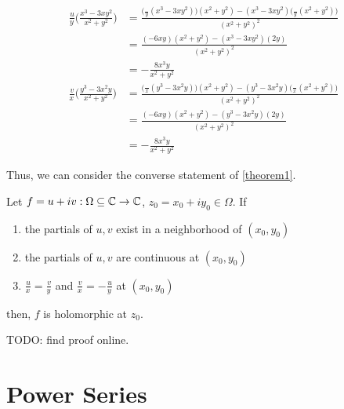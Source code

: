 \documentclass[11pt]{article}
\newcommand*{\pd}[3][]{\ensuremath{\frac{^{#1} #2}{ #3^{#1}}}}
\begin{document}
\begin{align*}
	\pd{u}{y}\bigg(\frac{x^3 - 3xy^2}{x^2+y^2}\bigg)
	&= \frac{\big(\pd{}{y}(x^3 - 3xy^2)\big)(x^2 + y^2) - (x^3 -
3xy^2)\big(\pd{}{y}(x^2+y^2)\big)}{(x^2 + y^2)^2}\\
&= \frac{(-6xy)(x^2 + y^2) - (x^3 - 3xy^2)(2y)}{(x^2 + y^2)^2}\\
&= -\frac{8x^3y}{x^2 + y^2}\\
\pd{v}{x}\bigg(\frac{y^3 - 3x^2y}{x^2+y^2} \bigg)
&= \frac{\big(\pd{}{x}(y^3 - 3x^2y)\big)(x^2 + y^2) - (y^3 -
3x^2y)\big(\pd{}{x}(x^2+y^2)\big)}{(x^2 + y^2)^2}\\
&= \frac{(-6xy)(x^2 + y^2) - (y^3 - 3x^2y)(2y)}{(x^2 + y^2)^2}\\
&= -\frac{8x^3y}{x^2 + y^2}
\end{align*}

Thus, we can consider the converse statement of \cref{theorem1}.
\begin{theorem}
	Let $f=u+iv : \Omega \subseteq \mathbb{C} \to \mathbb{C}$, $z_0 = x_0 + iy_0 \in \Omega$. If
	\begin{enumerate}
		\item the partials of $u,v$ exist in a neighborhood of $(x_0,y_0)$
		\item the partials of $u,v$ are continuous at $(x_0,y_0)$
		\item $\pd{u}{x} = \pd{v}{y}$ and $\pd{v}{x} = - \pd{u}{y}$ at
			$(x_0,y_0)$
	\end{enumerate}
	then, $f$ is holomorphic at $z_0$.
	\label{theorem2}
\end{theorem}
TODO: find proof online.

\pagebreak
\section{Power Series}
\end{document}
